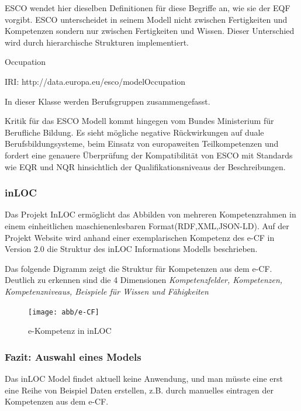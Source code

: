  ESCO wendet hier dieselben Definitionen für diese Begriffe an, wie sie der EQF vorgibt.\cite{https://ec.europa.eu/esco/portal/escopedia/Competence}
ESCO unterscheidet in seinem Modell nicht zwischen Fertigkeiten und Kompetenzen sondern nur zwischen Fertigkeiten und Wissen. Dieser Unterschied wird durch hierarchische Strukturen implementiert.  
\newline

Occupation 

IRI: http://data.europa.eu/esco/modelOccupation

In dieser Klasse werden Berufsgruppen zusammengefasst.

\vspace{1em}

Kritik für das ESCO Modell kommt hingegen vom Bundes Ministerium für Berufliche Bildung. Es sieht mögliche negative Rückwirkungen auf duale Berufsbildungsysteme, beim Einsatz von europaweiten Teilkompetenzen und fordert eine genauere Überprüfung der Kompatibilität von ESCO mit Standards wie EQR und NQR hinsichtlich der Qualifikationsniveaus der Beschreibungen. 

\subsubsection{inLOC}

Das Projekt InLOC ermöglicht das Abbilden von mehreren Kompetenzrahmen in einem einheitlichen maschienenlesbaren Format(RDF,XML,JSON-LD). 
Auf der Projekt Website wird anhand einer exemplarischen Kompetenz des e-CF in Version 2.0 die Struktur des inLOC Informations Modells beschrieben. \newline

Das folgende Digramm zeigt die Struktur für Kompetenzen aus dem e-CF.
 Deutlich zu erkennen sind die 4 Dimensionen \textit{Kompetenzfelder, Kompetenzen, Kompetenzniveaus, Beispiele für Wissen und Fähigkeiten}
 
 \begin{figure}[htb]
 \centering
 \texttt{[image: abb/e-CF]}
 \caption[Beschreibung]{e-Kompetenz in inLOC}
\label{fig:e-Kompetenz in inLOC}
\end{figure}

 
 \subsubsection{Fazit: Auswahl eines Models}
 
  Das inLOC Model findet aktuell keine Anwendung, und man müsste eine erst eine Reihe von Beispiel Daten erstellen, z.B. durch manuelles eintragen der Kompetenzen aus dem e-CF. \newline
 
